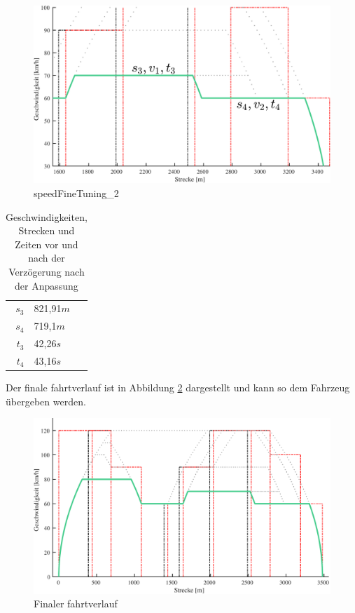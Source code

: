 \begin{figure}
  \includegraphics[width=\linewidth]{../images/matlab/it12.pdf}
  \caption{speedFineTuning\_2}
  \label{fig:it12}
\end{figure}
\begin{table}
\begin{center}
\renewcommand{\arraystretch}{1.2}
\begin{tabular}{r L{3cm}}
$s_3$                   	&   821,91$m$                      	\\ 
$s_4$                   	&   719,1$m$                         	\\ 
$t_3$                   	&   42,26$s$                         	\\ 
$t_4$                   	&   43,16$s$                         	\\ 
\end{tabular}
\renewcommand{\arraystretch}{1}
\caption{Geschwindigkeiten, Strecken und Zeiten vor und nach der Verzögerung nach der Anpassung}
\label{table:speed_fine_tuning_ex_2}
\end{center}
\end{table}
Der finale \Gls{fahrtverlauf} ist in Abbildung \ref{fig:it13} dargestellt und kann so dem Fahrzeug übergeben werden.
\begin{figure}
  \includegraphics[width=\linewidth]{../images/matlab/it13.pdf}
  \caption{Finaler \Gls{fahrtverlauf}}
  \label{fig:it13}
\end{figure}
